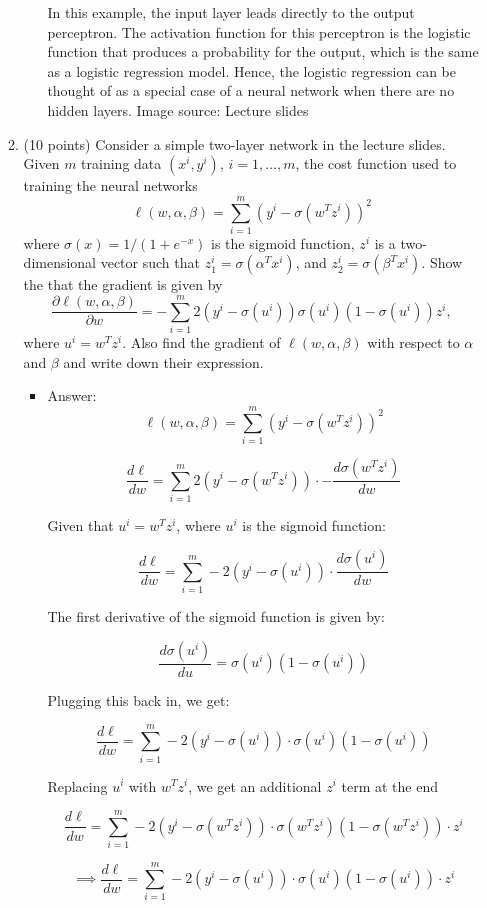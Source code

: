 \documentclass[twoside,10pt]{article}
\begin{document}
\begin{enumerate}
\begin{enumerate}
\begin{itemize}
In this example, the input layer leads directly to the output perceptron. The activation function for this perceptron is the logistic function that produces a probability for the output, which is the same as a logistic regression model. Hence, the logistic regression can be thought of as a special case of a neural network when there are no hidden layers.
Image source: Lecture slides
\end{itemize}
\item (10 points) 
Consider a simple two-layer network in the lecture slides. Given $m$ training data $(x^i, y^i)$, $i = 1, \ldots, m$, the cost function used to training the neural networks
\[
\ell(w, \alpha, \beta) = \sum_{i=1}^m (y^i - \sigma(w^T z^i))^2
\]
where $\sigma (x) = 1/(1+e^{-x})$ is the sigmoid function, $z^i$ is a two-dimensional vector such that  $z_1^i = \sigma(\alpha^T x^i)$, and $z_2^i = \sigma(\beta^T x^i)$. Show the that the gradient is given by
\[
\frac{\partial \ell(w, \alpha, \beta) }{\partial w}
= - \sum_{i=1}^m 2(y^i - \sigma(u^i))\sigma(u^i)(1-\sigma(u^i)) z^i,
\]
where $u^i = w^T z^i$. Also find the gradient of $\ell(w, \alpha, \beta)$ with respect to $\alpha$ and $\beta$ and write down their expression.
\begin{itemize}
\item Answer:\\

$$
\ell(w, \alpha, \beta) = \sum_{i=1}^m (y^i - \sigma(w^T z^i))^2
$$

$$ \frac{d \ell}{dw} = \sum_{i=1}^m 2(y^i - \sigma(w^T z^i)) \cdot -\frac{d \sigma(w^T z^i)}{dw}$$

Given that $u^i = w^T z^i$, where $u^i$ is the sigmoid function:

$$ \frac{d \ell}{dw} = \sum_{i=1}^m -2(y^i - \sigma(u^i)) \cdot \frac{d \sigma(u^i)}{dw}$$

The first derivative of the sigmoid function is given by:

$$ \frac{d\sigma(u^i)}{du} = \sigma(u^i)(1-\sigma(u^i))$$

Plugging this back in, we get:

$$ \frac{d \ell}{dw} = \sum_{i=1}^m -2(y^i - \sigma(u^i)) \cdot \sigma(u^i)(1-\sigma(u^i))$$

Replacing $u^i$ with $w^T z^i$, we get an additional $z^i$ term at the end

$$ \frac{d \ell}{dw} = \sum_{i=1}^m -2(y^i - \sigma(w^T z^i)) \cdot \sigma(w^T z^i)(1-\sigma(w^T z^i)) \cdot z^i$$

$$ \implies \frac{d \ell}{dw} = \sum_{i=1}^m -2(y^i - \sigma(u^i)) \cdot \sigma(u^i)(1-\sigma(u^i)) \cdot z^i$$


\end{itemize}
\end{enumerate}
\end{enumerate}
\end{document}
